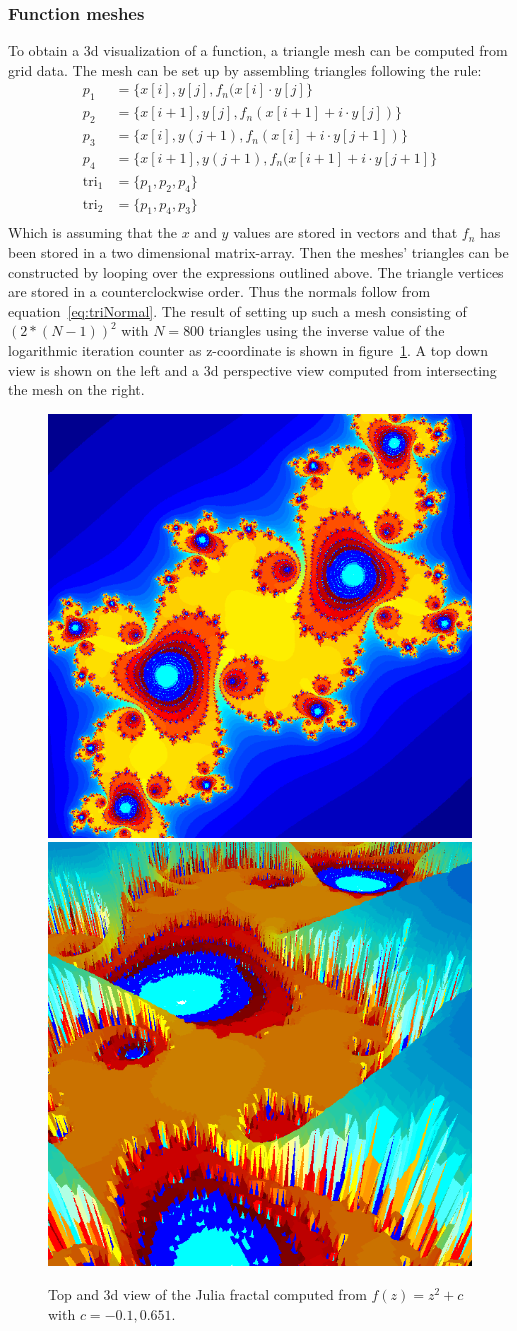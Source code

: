 \subsubsection{Function meshes}
To obtain a 3d visualization of a function, a triangle mesh can be computed from grid data. The mesh can be set up by assembling triangles following the rule:
\begin{align}
p_1 &= \{x[i],y[j],f_n(x[i]\cdot y[j]\}			\\
p_2 &= \{x[i+1],y[j],f_n(x[i+1] + i\cdot y[j])\}		\\
p_3 &= \{x[i],y(j+1),f_n(x[i]+i\cdot y[j+1])\}		\\
p_4 &= \{x[i+1],y(j+1),f_n(x[i+1]+i\cdot y[j+1]\}	\\
\text{tri}_1 &= \{p_1,p_2,p_4\} \\
\text{tri}_2 &= \{p_1,p_4,p_3\} \\
\end{align}
Which is assuming that the $x$ and $y$ values are stored in vectors and that $f_n$ has been stored in a two dimensional matrix-array. Then the meshes' triangles
can be constructed by looping over the expressions outlined above. The triangle vertices are stored in a counterclockwise order. Thus the normals follow from equation~\ref{eq:triNormal}. The result of setting up such a mesh consisting of $(2*(N-1))^2$ with $N = 800$ triangles using the inverse value of the logarithmic iteration counter as z-coordinate is shown in figure~\ref{fig:fractalValleyMap}. A top down view is shown on the left and a 3d perspective view computed from intersecting the mesh on the right.

\begin{figure}
\centering
\includegraphics[width=0.45\linewidth]{./img/fractalValleyMap}
\includegraphics[width=0.45\linewidth]{./img/fractalValley}
\caption{Top and 3d view of the Julia fractal computed from $f(z) = z^2 + c$ with $c = -0.1,0.651$.}
\label{fig:fractalValleyMap}
\end{figure}


